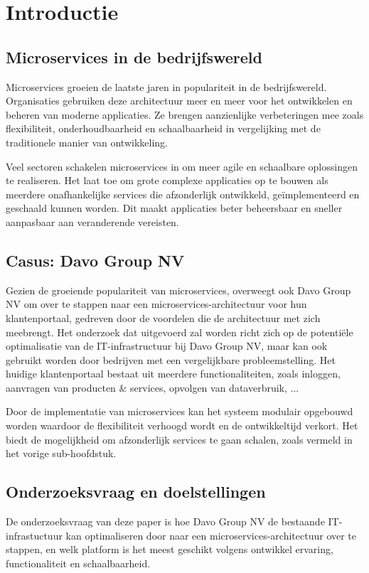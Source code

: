 
\section{Introductie}%
\label{sec:introductie}
\subsection{Microservices in de bedrijfswereld}
Microservices groeien de laatste jaren in populariteit in de bedrijfswereld. Organisaties gebruiken deze architectuur meer en meer voor het ontwikkelen en beheren van moderne applicaties. Ze brengen aanzienlijke verbeteringen mee zoals flexibiliteit, onderhoudbaarheid en schaalbaarheid in vergelijking met de traditionele manier van ontwikkeling.

Veel sectoren schakelen microservices in om meer agile en schaalbare oplossingen te realiseren. Het laat toe om grote complexe applicaties op te bouwen als meerdere onafhankelijke services die afzonderlijk ontwikkeld, geïmplementeerd en geschaald kunnen worden. Dit maakt applicaties beter beheersbaar en sneller aanpasbaar aan veranderende vereisten.

\subsection{Casus: Davo Group NV}
Gezien de groeiende populariteit van microservices, overweegt ook Davo Group NV om over te stappen naar een microservices-architectuur voor hun klantenportaal, gedreven door de voordelen die de architectuur met zich meebrengt. Het onderzoek dat uitgevoerd zal worden richt zich op de potentiële optimalisatie van de IT-\newline infrastructuur bij Davo Group NV, maar kan ook gebruikt worden door bedrijven met een vergelijkbare probleemstelling. Het huidige klantenportaal bestaat uit meerdere functionaliteiten, zoals inloggen, aanvragen van producten \& services, opvolgen van dataverbruik, ...

Door de implementatie van microservices kan het systeem modulair opgebouwd worden waardoor de flexibiliteit verhoogd wordt en de ontwikkeltijd verkort. Het biedt de mogelijkheid om afzonderlijk services te gaan schalen, zoals vermeld in het vorige sub-hoofdstuk.

\subsection{Onderzoeksvraag en doelstellingen}
De onderzoeksvraag van deze paper is hoe Davo Group NV de bestaande IT-infrastuctuur kan optimaliseren door naar een microservices-\newline architectuur over te stappen, en welk platform is het meest geschikt volgens ontwikkel ervaring, functionaliteit en schaalbaarheid.

